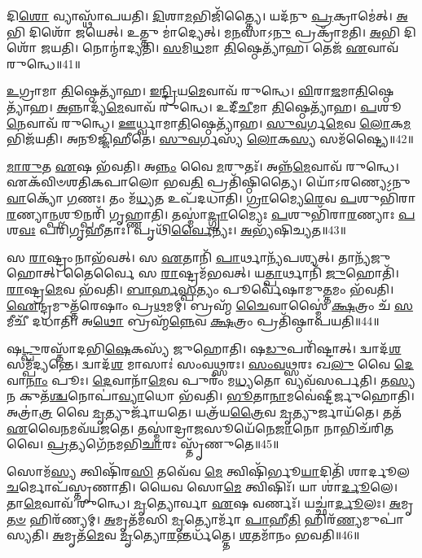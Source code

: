 𑌦𑌿\-\ul{𑌶𑍋} 𑌵𑍍𑌯𑌾𑌸𑍍𑌥𑌾᳴𑌪𑌯𑌤𑌿।
\-\ul{𑌦𑌿}\-𑌶𑌾\-\ul{𑌮}\-𑌭𑌿𑌜𑌿᳴𑌤𑍍𑌤𑍍𑌯𑍈।
𑌯𑌦᳴𑌨𑍁 \ul{𑌪𑍍𑌰}\-𑌕𑍍𑌰𑌾𑌮𑍇॑𑌤𑍍।
\-\ul{𑌅}\-𑌭𑌿 𑌦𑌿𑌶𑍋᳴ 𑌜𑌯𑍇𑌤𑍍।
𑌉𑌤𑍍𑌤𑍁 𑌮𑌾॑𑌦𑍍𑌯𑍇𑌤𑍍।
𑌮\-\ul{𑌨}\-𑌸𑌾𑌽\-\ul{𑌨𑍁} 𑌪𑍍𑌰𑌕𑍍𑌰𑌾᳴𑌮𑌤𑌿।
\-\ul{𑌅}\-𑌭𑌿 𑌦𑌿𑌶𑍋᳴ 𑌜𑌯𑌤𑌿।
𑌨𑍋𑌨𑍍𑌮𑌾॑𑌦𑍍𑌯𑌤𑌿।
\-\ul{𑌸}\-𑌮𑌿\-\ul{𑌧}\-𑌮𑌾 \ul{𑌤𑌿}\-𑌷𑍍𑌠𑍇𑌤𑍍𑌯𑌾᳴𑌹।
𑌤𑍇𑌜᳴ \ul{𑌏}\-𑌵𑌾𑌵᳴ 𑌰𑍁𑌨𑍍𑌧𑍇॥41॥

\-\ul{𑌉}\-𑌗𑍍𑌰𑌾𑌮𑌾 \ul{𑌤𑌿}\-𑌷𑍍𑌠𑍇𑌤𑍍𑌯𑌾᳴𑌹।
\-\ul{𑌇}\-\-\ul{𑌨𑍍𑌦𑍍𑌰𑌿}\-𑌯\-\ul{𑌮𑍇}\-𑌵𑌾𑌵᳴ 𑌰𑍁𑌨𑍍𑌧𑍇।
\-\ul{𑌵𑌿}\-𑌰𑌾\-\ul{𑌜}\-𑌮𑌾\-\ul{𑌤𑌿}\-𑌷𑍍𑌠𑍇𑌤𑍍𑌯𑌾᳴𑌹।
\-\ul{𑌅}\-𑌨𑍍𑌨𑌾𑌦𑍍𑌯᳴\-\ul{𑌮𑍇}\-𑌵𑌾𑌵᳴ 𑌰𑍁𑌨𑍍𑌧𑍇।
𑌉𑌦𑍀᳴\-\ul{𑌚𑍀}\-𑌮𑌾 \ul{𑌤𑌿}\-𑌷𑍍𑌠𑍇𑌤𑍍𑌯𑌾᳴𑌹।
\-\ul{𑌪}\-𑌶𑍂\-\ul{𑌨𑍇}\-𑌵𑌾𑌵᳴ 𑌰𑍁𑌨𑍍𑌧𑍇।
\-\ul{𑌊}\-𑌰𑍍𑌧𑍍𑌵𑌾𑌮𑌾\-\ul{𑌤𑌿}\-𑌷𑍍𑌠𑍇𑌤𑍍𑌯𑌾᳴𑌹।
\-\ul{𑌸𑍁}\-\-\ul{𑌵}\-𑌰𑍍𑌗\-\ul{𑌮𑍇}\-𑌵 \ul{𑌲𑍋}\-𑌕\-\ul{𑌮}\-𑌭𑌿𑌜᳴𑌯𑌤𑌿।
𑌅𑌨𑍂𑌜𑍍𑌜𑌿᳴𑌹𑍀𑌤𑍇।
\-\ul{𑌸𑍁}\-\-\ul{𑌵}\-𑌰𑍍𑌗𑌸𑍍𑌯᳴ \ul{𑌲𑍋}\-𑌕\-\ul{𑌸𑍍𑌯} 𑌸𑌮᳴𑌷𑍍𑌟𑍍𑌯𑍈॥42॥

\-\ul{𑌮𑌾}\-\-\ul{𑌰𑍁}\-𑌤 \ul{𑌏}\-𑌷 𑌭᳴𑌵𑌤𑌿।
𑌅\-\ul{𑌨𑍍𑌨𑌂} 𑌵𑍈 \ul{𑌮}\-𑌰𑍁𑌤𑌃᳴।
𑌅𑌨𑍍𑌨᳴\-\ul{𑌮𑍇}\-𑌵𑌾𑌵᳴ 𑌰𑍁𑌨𑍍𑌧𑍇।
𑌏𑌕᳴𑌵𑌿𑍞𑌶𑌤𑌿𑌕𑌪𑌾𑌲𑍋 𑌭𑌵\-\ul{𑌤𑌿} 𑌪𑍍𑌰𑌤𑌿᳴\-𑌷𑍍𑌠𑌿𑌤𑍍𑌯𑍈।
𑌯𑍋᳴𑌽𑌰𑌣𑍍𑌯𑍇\-𑌽𑌨𑍁\-\ul{𑌵𑌾}\-𑌕𑍍𑌯𑍋᳴ \ul{𑌗}\-𑌣𑌃।
𑌤𑌂 𑌮᳴\-\ul{𑌧𑍍𑌯}\-𑌤 𑌉𑌪᳴𑌦𑌧𑌾𑌤𑌿।
\-\ul{𑌗𑍍𑌰𑌾}\-𑌮𑍍𑌯𑍈\-\ul{𑌰𑍇}\-𑌵 \ul{𑌪}\-𑌶𑍁𑌭𑌿᳴𑌰𑌾\-\ul{𑌰}\-𑌣𑍍𑌯𑌾\-\ul{𑌨𑍍𑌪}\-𑌶𑍂\-𑌨𑍍𑌪𑌰𑌿᳴ 𑌗𑍃𑌹𑍍𑌣𑌾𑌤𑌿।
𑌤𑌸𑍍𑌮𑌾॑\-\ul{𑌦𑍍𑌗𑍍𑌰𑌾}\-𑌮𑍍𑌯𑍈𑌃 \ul{𑌪}\-𑌶𑍁𑌭𑌿᳴𑌰𑌾\-\ul{𑌰}\-𑌣𑍍𑌯𑌾𑌃 \ul{𑌪}\-𑌶\-\ul{𑌵𑌃} 𑌪𑌰𑌿᳴𑌗𑍃𑌹𑍀𑌤𑌾𑌃।
𑌪𑍃𑌥𑌿᳴\-\ul{𑌰𑍍𑌵𑍈}\-𑌨𑍍𑌯𑌃।
\-\ul{𑌅}\-𑌭𑍍𑌯᳴𑌷𑌿𑌚𑍍𑌯𑌤॥43॥

𑌸 \ul{𑌰𑌾}\-𑌷𑍍𑌟𑍍𑌰𑌂 𑌨𑌾𑌭᳴𑌵𑌤𑍍।
𑌸 \ul{𑌏}\-𑌤𑌾𑌨𑌿᳴ \ul{𑌪𑌾}\-𑌰𑍍𑌥𑌾𑌨𑍍𑌯᳴𑌪𑌶𑍍𑌯𑌤𑍍।
𑌤𑌾𑌨𑍍𑌯᳴𑌜𑍁𑌹𑍋𑌤𑍍।
𑌤𑍈𑌰𑍍𑌵𑍈 𑌸 \ul{𑌰𑌾}\-𑌷𑍍𑌟𑍍𑌰𑌮᳴𑌭𑌵𑌤𑍍।
𑌯\-\ul{𑌤𑍍𑌪𑌾}\-𑌰𑍍𑌥𑌾𑌨𑌿᳴ \ul{𑌜𑍁}\-𑌹𑍋𑌤𑌿᳴।
\-\ul{𑌰𑌾}\-𑌷𑍍𑌟𑍍𑌰\-\ul{𑌮𑍇}\-𑌵 𑌭᳴𑌵𑌤𑌿।
\-\ul{𑌬𑌾}\-\-\ul{𑌰𑍍}\-\-\ul{𑌹}\-\-\ul{𑌸𑍍𑌪}\-𑌤𑍍𑌯𑌂 𑌪𑍂𑌰𑍍𑌵𑍇᳴𑌷𑌾𑌮𑍁\-\ul{𑌤𑍍𑌤}\-𑌮𑌂 𑌭᳴𑌵𑌤𑌿।
\-\ul{𑌐}\-𑌨𑍍𑌦𑍍𑌰𑌮𑍁𑌤𑍍𑌤᳴𑌰𑍇𑌷𑌾𑌂 𑌪𑍍𑌰\-\ul{𑌥}\-𑌮𑌮𑍍।
𑌬𑍍𑌰𑌹𑍍𑌮᳴ \ul{𑌚𑍈}\-𑌵𑌾𑌸𑍍𑌮𑍈॑ \ul{𑌕𑍍𑌷}\-𑌤𑍍𑌰𑌂 𑌚᳴ \ul{𑌸}\-𑌮𑍀𑌚𑍀᳴ 𑌦𑌧𑌾𑌤𑌿।
𑌅\-\ul{𑌥𑍋} 𑌬𑍍𑌰𑌹𑍍𑌮᳴\-\ul{𑌨𑍍𑌨𑍇}\-𑌵 \ul{𑌕𑍍𑌷}\-𑌤𑍍𑌰𑌂 𑌪𑍍𑌰𑌤𑌿᳴\-𑌷𑍍𑌠𑌾𑌪𑌯𑌤𑌿॥44॥

𑌷\-\ul{𑌟𑍍𑌪𑍁}\-𑌰𑌸𑍍𑌤𑌾᳴𑌦𑌭𑌿\-\ul{𑌷𑍇}\-𑌕𑌸𑍍𑌯᳴ 𑌜𑍁𑌹𑍋𑌤𑌿।
𑌷\-\ul{𑌡𑍁}\-𑌪𑌰𑌿᳴𑌷𑍍𑌟𑌾𑌤𑍍।
𑌦𑍍𑌵𑌾𑌦᳴\-\ul{𑌶} 𑌸𑌮𑍍𑌪᳴𑌦𑍍𑌯𑌨𑍍𑌤𑍇।
𑌦𑍍𑌵𑌾𑌦᳴\-\ul{𑌶} 𑌮𑌾𑌸𑌾𑌃॑ 𑌸𑌂𑌵\-\ul{𑌥𑍍𑌸}\-𑌰𑌃।
\-\ul{𑌸𑌂}\-\-\ul{𑌵}\-\-\ul{𑌥𑍍𑌸}\-𑌰𑌃 𑌖\-\ul{𑌲𑍁} 𑌵𑍈 \ul{𑌦𑍇}\-𑌵𑌾\-\ul{𑌨𑌾𑌂} 𑌪𑍂𑌃।
\-\ul{𑌦𑍇}\-𑌵𑌾𑌨𑌾᳴\-\ul{𑌮𑍇}\-𑌵 𑌪𑍁𑌰𑌂᳴ 𑌮\-\ul{𑌧𑍍𑌯}\-𑌤𑍋 𑌵𑍍𑌯𑌵᳴𑌸𑌰𑍍𑌪𑌤𑌿।
𑌤\-\ul{𑌸𑍍𑌯} 𑌨 𑌕𑍁𑌤᳴\-\ul{𑌶𑍍𑌚}\-𑌨𑍋𑌪𑌾॑\-\ul{𑌵𑍍𑌯𑌾}\-𑌧𑍋 𑌭᳴𑌵𑌤𑌿।
\-\ul{𑌭𑍂}\-𑌤𑌾\-\ul{𑌨𑌾}\-𑌮𑌵𑍇॑𑌷𑍍𑌟𑍀𑌰𑍍𑌜𑍁𑌹𑍋𑌤𑌿।
𑌅𑌤𑍍𑌰𑌾॑\-\ul{𑌤𑍍𑌰} 𑌵𑍈 \ul{𑌮𑍃}\-𑌤𑍍𑌯𑍁𑌰𑍍𑌜𑌾᳴𑌯𑌤𑍇।
𑌯𑌤𑍍𑌰᳴𑌯\-\ul{𑌤𑍍𑌰𑍈}\-𑌵 \ul{𑌮𑍃}\-𑌤𑍍𑌯𑍁𑌰𑍍𑌜𑌾𑌯᳴𑌤𑍇।
𑌤𑌤᳴ \ul{𑌏}\-𑌵𑍈\-\ul{𑌨}\-𑌮𑌵᳴𑌯𑌜𑌤𑍇।
𑌤𑌸𑍍𑌮𑌾॑𑌦𑍍𑌰𑌾\-\ul{𑌜}\-𑌸𑍂𑌯𑍇᳴𑌨𑍇\-\ul{𑌜𑌾}\-𑌨𑍋 𑌨𑌾𑌭𑌿𑌚᳴𑌰𑌿\-\ul{𑌤}\-𑌵𑍈।
\-\ul{𑌪𑍍𑌰}\-𑌤𑍍𑌯𑌗𑍇᳴𑌨𑌮𑌭𑌿\-\ul{𑌚𑌾}\-𑌰𑌃 𑌸𑍍𑌤𑍃᳴𑌣𑍁𑌤𑍇॥45॥\anuvakamend[\-\ul{𑌰𑍁}\-\-\ul{𑌨𑍍𑌧𑍇} 𑌸𑌮᳴𑌷𑍍𑌟𑍍𑌯𑌾 𑌅𑌸𑌿𑌚𑍍𑌯𑌤 𑌸𑍍𑌥𑌾𑌪𑌯\-\ul{𑌤𑌿} 𑌜𑌾𑌯᳴\-\ul{𑌤𑍇} 𑌪𑌞𑍍𑌚᳴ 𑌚]

𑌸𑍋𑌮᳴\-\ul{𑌸𑍍𑌯} 𑌤𑍍𑌵𑌿𑌷𑌿᳴𑌰\-\ul{𑌸𑌿} 𑌤𑌵𑍇᳴𑌵 \ul{𑌮𑍇} 𑌤𑍍𑌵𑌿𑌷𑌿᳴𑌰𑍍𑌭𑍂\-\ul{𑌯𑌾}\-𑌦𑌿𑌤𑌿᳴ 𑌶𑌾𑌰𑍍𑌦𑍂𑌲\-\-\ul{𑌚}\-𑌰𑍍𑌮𑍋𑌪᳴𑌸𑍍𑌤𑍃𑌣𑌾𑌤𑌿।
𑌯𑍈𑌵 𑌸𑍋\-\ul{𑌮𑍇} 𑌤𑍍𑌵𑌿𑌷𑌿𑌃᳴।
𑌯𑌾 𑌶𑌾॑\-\ul{𑌰𑍍𑌦𑍂}\-𑌲𑍇।
𑌤𑌾\-\ul{𑌮𑍇}\-𑌵𑌾𑌵᳴ 𑌰𑍁𑌨𑍍𑌧𑍇।
\-\ul{𑌮𑍃}\-𑌤𑍍𑌯𑍋𑌰𑍍𑌵𑌾 \ul{𑌏}\-𑌷 𑌵𑌰𑍍𑌣𑌃᳴।
𑌯𑌚𑍍𑌛𑌾॑\-\ul{𑌰𑍍𑌦𑍂}\-𑌲𑌃।
\-\ul{𑌅}\-𑌮𑍃\-\ul{𑌤}\-\-\ul{𑍞} 𑌹𑌿𑌰᳴𑌣𑍍𑌯𑌮𑍍।
\-\ul{𑌅}\-𑌮𑍃𑌤᳴𑌮𑌸𑌿 \ul{𑌮𑍃}\-𑌤𑍍𑌯𑍋𑌰𑍍𑌮𑌾᳴ \ul{𑌪𑌾}\-𑌹𑍀\-\ul{𑌤𑌿} 𑌹𑌿𑌰᳴\-\ul{𑌣𑍍𑌯}\-𑌮𑍁𑌪𑌾॑𑌸𑍍𑌯𑌤𑌿।
\-\ul{𑌅}\-𑌮𑍃𑌤᳴\-\ul{𑌮𑍇}\-𑌵 \ul{𑌮𑍃}\-𑌤𑍍𑌯𑍋\-\ul{𑌰}\-𑌨𑍍𑌤𑌰𑍍𑌧᳴𑌤𑍍𑌤𑍇।
\-\ul{𑌶}\-𑌤𑌮𑌾᳴𑌨𑌂 𑌭𑌵𑌤𑌿॥46॥

